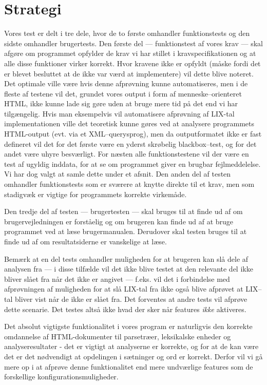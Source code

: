 \documentclass[a4paper,oneside,article]{memoir}
\begin{document}
\chapter{Strategi}
Vores test er delt i tre dele, hvor de to første omhandler
funktionstests og den sidste omhandler brugertests. Den første del ---
funktionstest af vores krav --- skal afgøre om programmet opfylder de
krav vi har stillet i kravspecifikationen og at alle disse funktioner
virker korrekt. Hvor kravene ikke er opfyldt (måske fordi det er
blevet besluttet at de ikke var værd at implementere) vil dette blive
noteret. Det optimale ville være hvis denne afprøvning kunne
automatiseres, men i de fleste af testene vil det, grundet vores
output i form af menneske--orienteret HTML, ikke kunne lade sig gøre
uden at bruge mere tid på det end vi har tilgængelig. Hvis man
eksempelvis vil automatisere afprøvning af LIX-tal implementationen
ville det teoretisk kunne gøres ved at analysere programmets
HTML-output (evt. via et XML--querysprog), men da outputformatet ikke
er fast defineret vil det for det første være en yderst skrøbelig
blackbox--test, og for det andet være uhyre besværligt. For næsten alle
funktionstestene vil der være en test af ugyldig inddata, for at se om
programmet giver en brugbar fejlmeddelelse. Vi har dog valgt at samle
dette under et afsnit. Den anden del af testen omhandler
funktionstests som er sværere at knytte direkte til et krav, men som
stadigvæk er vigtige for programmets korrekte virkemåde.

Den tredje del af testen --- brugertesten --- skal bruges til at finde
ud af om brugervejledningen er forståelig og om brugeren kan finde ud
af at bruge programmet ved at læse brugermanualen. Derudover skal
testen bruges til at finde ud af om resultatsiderne er vanskelige at
læse.

Bemærk at en del tests omhandler muligheden for at brugeren kan slå
dele af analysen fra --- i disse tilfælde vil det ikke blive testet at
den relevante del ikke bliver slået fra når det ikke er angivet ---
f.eks. vil det i forbindelse med afprøvningen af muligheden for at slå
LIX-tal fra ikke også blive afprøvet at LIX--tal bliver vist når de
ikke er slået fra. Det forventes at andre tests vil afprøve dette
scenarie. Det testes altså ikke hvad der sker når features
\textit{ikke} aktiveres.

Det absolut vigtigste funktionalitet i vores program er naturligvis
den korrekte omdannelse af HTML-dokumenter til parsetræer, leksikalske
enheder og analyseresultater - det er vigtigt at analyserne er
korrekte, og for at de kan være det er det nødvendigt at opdelingen i
sætninger og ord er korrekt. Derfor vil vi gå mere op i at afprøve
denne funktionalitet end mere undværlige features som de forskellige
konfigurationsmuligheder.
\end{document}
